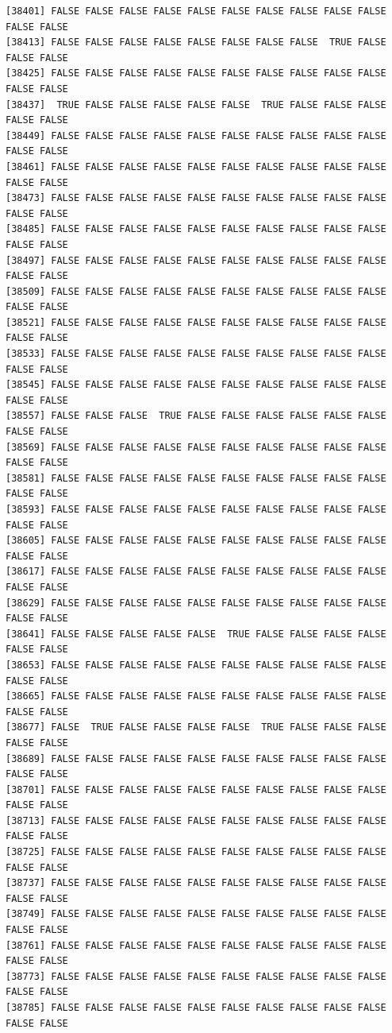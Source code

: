 \documentclass[
  a4paper,
  DIV=11,
  numbers=noendperiod]{scrartcl}
\begin{document}
\begin{verbatim}
[38401] FALSE FALSE FALSE FALSE FALSE FALSE FALSE FALSE FALSE FALSE FALSE FALSE
[38413] FALSE FALSE FALSE FALSE FALSE FALSE FALSE FALSE  TRUE FALSE FALSE FALSE
[38425] FALSE FALSE FALSE FALSE FALSE FALSE FALSE FALSE FALSE FALSE FALSE FALSE
[38437]  TRUE FALSE FALSE FALSE FALSE FALSE  TRUE FALSE FALSE FALSE FALSE FALSE
[38449] FALSE FALSE FALSE FALSE FALSE FALSE FALSE FALSE FALSE FALSE FALSE FALSE
[38461] FALSE FALSE FALSE FALSE FALSE FALSE FALSE FALSE FALSE FALSE FALSE FALSE
[38473] FALSE FALSE FALSE FALSE FALSE FALSE FALSE FALSE FALSE FALSE FALSE FALSE
[38485] FALSE FALSE FALSE FALSE FALSE FALSE FALSE FALSE FALSE FALSE FALSE FALSE
[38497] FALSE FALSE FALSE FALSE FALSE FALSE FALSE FALSE FALSE FALSE FALSE FALSE
[38509] FALSE FALSE FALSE FALSE FALSE FALSE FALSE FALSE FALSE FALSE FALSE FALSE
[38521] FALSE FALSE FALSE FALSE FALSE FALSE FALSE FALSE FALSE FALSE FALSE FALSE
[38533] FALSE FALSE FALSE FALSE FALSE FALSE FALSE FALSE FALSE FALSE FALSE FALSE
[38545] FALSE FALSE FALSE FALSE FALSE FALSE FALSE FALSE FALSE FALSE FALSE FALSE
[38557] FALSE FALSE FALSE  TRUE FALSE FALSE FALSE FALSE FALSE FALSE FALSE FALSE
[38569] FALSE FALSE FALSE FALSE FALSE FALSE FALSE FALSE FALSE FALSE FALSE FALSE
[38581] FALSE FALSE FALSE FALSE FALSE FALSE FALSE FALSE FALSE FALSE FALSE FALSE
[38593] FALSE FALSE FALSE FALSE FALSE FALSE FALSE FALSE FALSE FALSE FALSE FALSE
[38605] FALSE FALSE FALSE FALSE FALSE FALSE FALSE FALSE FALSE FALSE FALSE FALSE
[38617] FALSE FALSE FALSE FALSE FALSE FALSE FALSE FALSE FALSE FALSE FALSE FALSE
[38629] FALSE FALSE FALSE FALSE FALSE FALSE FALSE FALSE FALSE FALSE FALSE FALSE
[38641] FALSE FALSE FALSE FALSE FALSE  TRUE FALSE FALSE FALSE FALSE FALSE FALSE
[38653] FALSE FALSE FALSE FALSE FALSE FALSE FALSE FALSE FALSE FALSE FALSE FALSE
[38665] FALSE FALSE FALSE FALSE FALSE FALSE FALSE FALSE FALSE FALSE FALSE FALSE
[38677] FALSE  TRUE FALSE FALSE FALSE FALSE  TRUE FALSE FALSE FALSE FALSE FALSE
[38689] FALSE FALSE FALSE FALSE FALSE FALSE FALSE FALSE FALSE FALSE FALSE FALSE
[38701] FALSE FALSE FALSE FALSE FALSE FALSE FALSE FALSE FALSE FALSE FALSE FALSE
[38713] FALSE FALSE FALSE FALSE FALSE FALSE FALSE FALSE FALSE FALSE FALSE FALSE
[38725] FALSE FALSE FALSE FALSE FALSE FALSE FALSE FALSE FALSE FALSE FALSE FALSE
[38737] FALSE FALSE FALSE FALSE FALSE FALSE FALSE FALSE FALSE FALSE FALSE FALSE
[38749] FALSE FALSE FALSE FALSE FALSE FALSE FALSE FALSE FALSE FALSE FALSE FALSE
[38761] FALSE FALSE FALSE FALSE FALSE FALSE FALSE FALSE FALSE FALSE FALSE FALSE
[38773] FALSE FALSE FALSE FALSE FALSE FALSE FALSE FALSE FALSE FALSE FALSE FALSE
[38785] FALSE FALSE FALSE FALSE FALSE FALSE FALSE FALSE FALSE FALSE FALSE FALSE

\end{verbatim}
\end{document}
